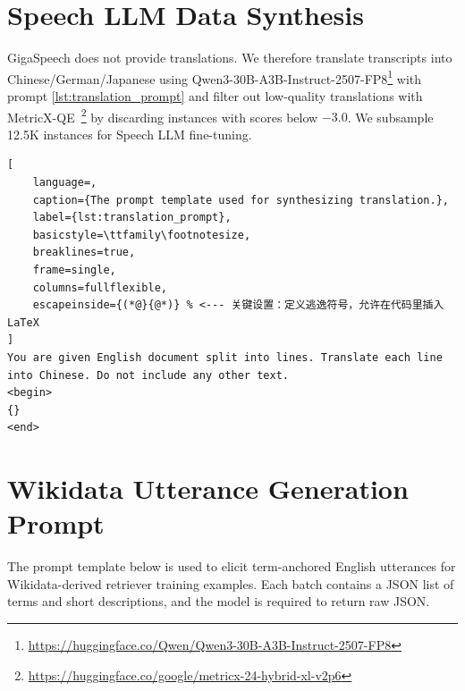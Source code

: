 \section{Speech LLM Data Synthesis}
\label{sec:speechllm_data_synth}

GigaSpeech does not provide translations. We therefore translate transcripts into Chinese/German/Japanese using Qwen3-30B-A3B-Instruct-2507-FP8\footnote{\url{https://huggingface.co/Qwen/Qwen3-30B-A3B-Instruct-2507-FP8}} with prompt \ref{lst:translation_prompt} and filter out low-quality translations with MetricX-QE~\citep{juraska-etal-2024-metricx}\footnote{\url{https://huggingface.co/google/metricx-24-hybrid-xl-v2p6}} by discarding instances with scores below $-3.0$. We subsample 12.5K instances for Speech LLM fine-tuning.


\begin{lstlisting}[
    language=, 
    caption={The prompt template used for synthesizing translation.}, 
    label={lst:translation_prompt}, 
    basicstyle=\ttfamily\footnotesize, 
    breaklines=true, 
    frame=single, 
    columns=fullflexible,
    escapeinside={(*@}{@*)} % <--- 关键设置：定义逃逸符号，允许在代码里插入 LaTeX
]
You are given English document split into lines. Translate each line into Chinese. Do not include any other text.
<begin>
{}
<end>
\end{lstlisting}


\section{Wikidata Utterance Generation Prompt}
\label{app:wiki_utterance_prompt}

The prompt template below is used to elicit term-anchored English utterances for Wikidata-derived retriever training examples. Each batch contains a JSON list of terms and short descriptions, and the model is required to return raw JSON.

